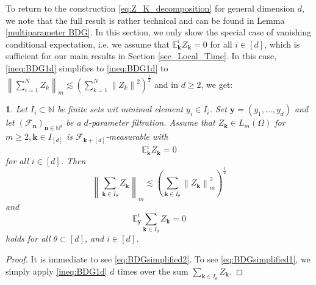 \documentclass[11pt,oneside,english,reqno]{amsart}
\numberwithin{equation}{section}
\numberwithin{figure}{section}
\theoremstyle{plain}
\theoremstyle{definition}
\theoremstyle{remark}
\theoremstyle{plain}
\newtheorem{lem}[thm]{\protect\lemmaname}
\theoremstyle{plain}
\theoremstyle{plain}
\theoremstyle{plain}
\theoremstyle{plain}
\providecommand{\lemmaname}{Lemma}
\newcommand{\cF}{\mathcal{F}}
\newcommand{\EE}{\mathbb{E}}
\newcommand{\NN}{\mathbb{N}}
\newcommand{\bk}{\mathbf{k}}
\newcommand{\bn}{\mathbf{n}}
\newcommand{\by}{\mathbf{y}}
\newcommand{\norm}[1]{\left\lVert #1\right\rVert}
\begin{document}
To return to the construction \eqref{eq:Z_K_decomposition} for general dimension $d$, we note that the full result is rather technical and can be found in Lemma \ref{multiparameter BDG}. In this section, we only show the special case of vanishing conditional expectation, i.e. we assume that $\EE^i_\bk Z_\bk = 0$ for all $i\in [d]$, which is sufficient for our main results in Section \ref{sec_Local_Time}. In this case, \eqref{ineq:BDG1d} simplifies to \eqref{ineq:BDG1d} to $\norm{\sum_{i=1}^N Z_k}_m\lesssim \left(\sum_{k=1}^N\norm{Z_k}^2\right)^{\frac 12}$ and in $d\ge2$, we get:
%
\begin{lem}\label{lem:muti-parameterBDG-simplified}
    Let $I_i\subset\NN$ be finite sets wit minimal element $y_i\in I_i$. Set $\by = (y_1,\dots,y_d)$ and let $(\cF_\bn)_{\bn\in\NN^d}$ be a $d$-parameter filtration. Assume that $Z_\bk\in L_m(\Omega)$ for $m\ge 2, \bk\in I_{[d]}$ is $\cF_{\bk+[d]}$-measurable with
%
    \begin{equation*}
        \EE^i_\bk Z_\bk = 0
    \end{equation*}
%
    for all $i\in [d]$. Then
%
    \begin{equation}\label{eq:BDGsimplified1}
        \norm{\sum_{\bk\in I_\theta} Z_\bk}_m\lesssim\left(\sum_{\bk\in I_\theta}\norm{Z_\bk}_m^2\right)^{\frac12}
    \end{equation}
%
    and
%
    \begin{equation}\label{eq:BDGsimplified2}
        \EE_\by^i \sum_{\bk\in I_\theta} Z_\bk = 0
    \end{equation}
%
    holds for all $\theta\subset[d]$, and $i\in[d]$.
\end{lem}
%
\begin{proof}
    It is immediate to see \eqref{eq:BDGsimplified2}. To see \eqref{eq:BDGsimplified1}, we simply apply \eqref{ineq:BDG1d} $d$ times over the sum $\sum_{\bk\in I_\theta} Z_\bk$.
\end{proof}
%
\end{document}
